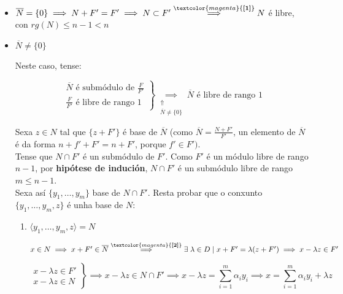 \documentclass[twoside]{report}
\newcommand{\magbf}[1]{\textcolor{magenta}{\textbf{#1}}} %
\theoremstyle{mystyle}
\begin{document}
\begin{itemize}
    \item $\overline{N} = \{0\} \implies N + F' = F' \implies N \subset F' \overset{\magbf{[1]}}{\implies} N$ é libre, con $rg(N) \leq n -1 < n$
    \item $\overline{N} \neq \{0\}$
    
    Neste caso, tense:
    
    \[ 
    \left. \begin{array}{r} 
    \overline{N} \text{ é submódulo de } \displaystyle \frac{F}{F'}\\[1ex]
    \displaystyle \frac{F}{F'} \text{ é libre de rango } 1
    \end{array} \right\}
    \underset{\substack{\Uparrow \\ \overline{N} \neq \{0\}}}{\implies} 
    \overline{N} \text{ é libre de rango 1}
    \]   
    
    \vspace{3mm}
    
    Sexa $z \in N$ tal que $\{z + F'\}$ é base de $\overline{N}$ (como $\overline{N} = \displaystyle \frac{N + F'}{F'}$, un elemento de $\overline{N}$ é da forma $n + f' + F' = n + F'$, porque $f' \in F')$.\\
    
    Tense que $N \cap F'$ é un submódulo de $F'$. Como $F'$ é un módulo libre de rango $n-1$, por \textbf{hipótese de indución}, $N \cap F'$ é un submódulo libre de rango $m \leq n-1$.\\
    
    Sexa así $\{y_{1}, \dots, y_{m}\}$ base de $N \cap F'$. Resta probar que o conxunto $\{y_{1}, \dots, y_{m}, z\}$ é unha base de $N$:
    
    \begin{enumerate}
        \item $\langle y_{1}, \dots, y_{m}, z \rangle = N$
        
        $x \in N \implies x + F' \in \overline{N} \overset{\magbf{[2]}}{\implies} \exists \hspace{1mm} \lambda \in D \hspace{1mm} | \hspace{1mm} x + F' = \lambda(z + F') \implies x - \lambda z \in F'$
        
            \[ 
            \left. \begin{array}{r} 
            x - \lambda z \in F'\\[1ex]
            x - \lambda z \in N
            \end{array} \right\}
            \implies x - \lambda z \in N \cap F' \implies x - \lambda z = \displaystyle \sum_{i = 1}^{m}{\alpha_{i}y_{i}} \implies x = \displaystyle \sum_{i = 1}^{m}{\alpha_{i}y_{i}} + \lambda z
            \]   
        

\end{enumerate}
\end{itemize}
\end{document}
